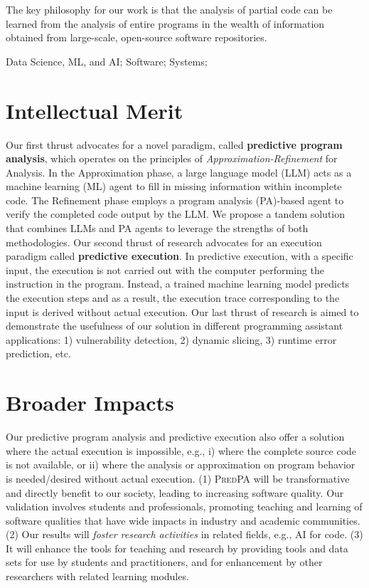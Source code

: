 \documentclass[11pt]{article}
\newcommand{\tool}{\textsc{PredPA}\xspace}
\begin{document}
The key philosophy for our work is that the analysis of
partial code can be learned from the analysis of entire programs in
the wealth of information obtained from large-scale, open-source
software repositories.


 Data Science, ML, and AI; Software; Systems;

\section{Intellectual Merit}

Our first thrust advocates for a novel paradigm, called {\bf
  predictive program analysis}, which operates on the principles of
{\em Approximation-Refinement} for Analysis. In the Approximation
phase, a large language model (LLM) acts as a machine learning (ML)
agent to fill in missing information within incomplete code. The
Refinement phase employs a program analysis (PA)-based agent to verify
the completed code output by the LLM. We propose a tandem solution
that combines LLMs and PA agents to leverage the strengths of both
methodologies. Our second thrust of research advocates for an
execution paradigm called {\bf predictive execution}. In predictive
execution, with a specific input, the execution is not carried out
with the computer performing the instruction in the program. Instead,
a trained machine learning model predicts the execution steps and as a
result, the execution trace corresponding to the input is derived
without actual execution. Our last thrust of research is aimed to
demonstrate the usefulness of our solution in different programming
assistant applications: 1) vulnerability detection, 2) dynamic
slicing, 3) runtime error prediction, etc.

\section{Broader Impacts}


Our predictive program analysis and predictive execution also offer a
solution where the actual execution is impossible, e.g., i) where the complete source code is
not available, or ii) where the analysis or approximation on
program behavior is needed/desired without actual execution. (1)
{\tool} will be transformative and directly benefit to our
  society, leading to increasing software quality.  Our validation
involves students and professionals, promoting teaching and learning
of software qualities that have wide impacts in industry and academic
communities. (2) Our results will {\em foster research activities} in
related fields, e.g., AI for code. (3) It will
enhance the tools for teaching and research by providing tools and
data sets for use by students and practitioners, and for enhancement
by other researchers with related learning modules.
\end{document}

